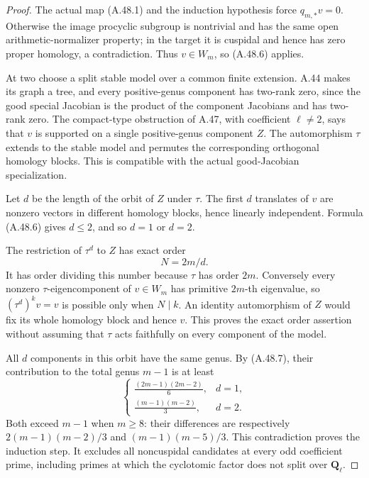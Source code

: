 \begin{proof}
The actual map (A.48.1) and the induction hypothesis
force \(q_{m,*}v=0\). Otherwise the image procyclic
subgroup is nontrivial and has the same open
arithmetic-normalizer property; in the target it is
cuspidal and hence has zero proper homology, a
contradiction. Thus \(v\in W_m\), so (A.48.6)
applies.

At two choose a split stable model over a common
finite extension. A.44 makes its graph a tree, and
every positive-genus component has two-rank zero,
since the good special Jacobian is the product of
the component Jacobians and has two-rank zero. The
compact-type obstruction of A.47, with coefficient
\(\ell\ne2\), says that \(v\) is supported
on a single positive-genus component \(Z\).
The automorphism \(\tau\) extends to the stable
model and permutes the corresponding orthogonal
homology blocks. This is compatible with the actual
good-Jacobian specialization.

Let \(d\) be the length of the orbit of \(Z\)
under \(\tau\). The first \(d\) translates of
\(v\) are nonzero vectors in different homology
blocks, hence linearly independent. Formula
(A.48.6) gives \(d\le2\), and so \(d=1\)
or \(d=2\).

The restriction of \(\tau^d\) to \(Z\) has
exact order
\[
                              N=2m/d.              \tag{A.48.9}
\]
It has order dividing this number because \(\tau\)
has order \(2m\). Conversely every nonzero
\(\tau\)-eigencomponent of \(v\in W_m\)
has primitive \(2m\)-th eigenvalue, so
\((\tau^d)^k v=v\) is possible only when
\(N\mid k\). An identity automorphism of \(Z\)
would fix its whole homology block and hence \(v\).
This proves the exact order assertion without
assuming that \(\tau\) acts faithfully on every
component of the model.

All \(d\) components in this orbit have the same
genus. By (A.48.7), their contribution to the total
genus \(m-1\) is at least
\[
 \begin{cases}
  \displaystyle\frac{(2m-1)(2m-2)}6,&d=1,\\[4pt]
  \displaystyle\frac{(m-1)(m-2)}3,&d=2.
 \end{cases}                                                   \tag{A.48.10}
\]
Both exceed \(m-1\) when \(m\ge8\): their
differences are respectively
\(2(m-1)(m-2)/3\) and \((m-1)(m-5)/3\).
This contradiction proves the induction step.
It excludes all noncuspidal candidates at every odd
coefficient prime, including primes at which the
cyclotomic factor does not split over
\(\mathbf Q_\ell\).


\end{proof}
